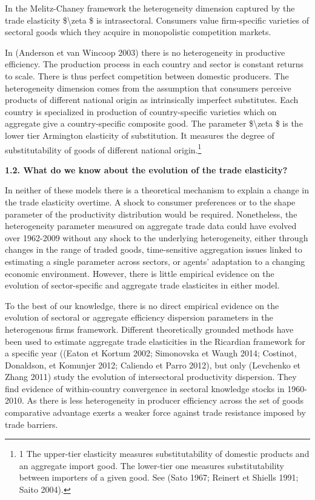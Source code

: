 \documentclass[12pt,twoside,a4paper,notitlepage]{article}
\begin{document}
In the Melitz-Chaney framework the heterogeneity dimension captured by the trade elasticity \$\textbackslash zeta \$ is intrasectoral. Consumers value firm-specific varieties of sectoral goods which they acquire in monopolistic competition markets.

In (Anderson et van Wincoop 2003) there is no heterogeneity in productive efficiency. The production process in each country and sector is constant returns to scale. There is thus perfect competition between domestic producers. The heterogeneity dimension comes from the assumption that consumers perceive products of different national origin as intrinsically imperfect substitutes. Each country is specialized in production of country-specific varieties which on aggregate give a country-specific composite good. The parameter \$\textbackslash zeta \$ is the lower tier Armington elasticity of substitution. It measures the degree of substitutability of goods of different national origin.\footnote{1 The upper-tier elasticity measures substitutability of domestic products and an aggregate import good. The lower-tier one measures substitutability between importers of a given good. See (Sato 1967; Reinert et Shiells 1991; Saito 2004).
} 

\textbf{1.2. What do we know about the evolution of the trade elasticity? \label{mark-1.2.}}

In neither of these models there is a theoretical mechanism to explain a change in the trade elasticity overtime. A shock to consumer preferences or to the shape parameter of the productivity distribution would be required. Nonetheless, the heterogeneity parameter measured on aggregate trade data could have evolved over 1962-2009 without any shock to the underlying heterogeneity, either through changes in the range of traded goods, time-sensitive aggregation issues linked to estimating a single parameter across sectors, or agents' adaptation to a changing economic environment. However, there is little empirical evidence on the evolution of sector-specific and aggregate trade elasticites in either model.

To the best of our knowledge, there is no direct empirical evidence on the evolution of sectoral or aggregate efficiency dispersion parameters in the heterogenous firms framework. Different theoretically grounded methods have been used to estimate aggregate trade elasticities in the Ricardian framework for a specific year ((Eaton et Kortum 2002; Simonovska et Waugh 2014; Costinot, Donaldson, et Komunjer 2012; Caliendo et Parro 2012), but only (Levchenko et Zhang 2011) study the evolution of intersectoral productivity dispersion. They find evidence of within-country convergence in sectoral knowledge stocks in 1960-2010. As there is less heterogeneity in producer efficiency across the set of goods comparative advantage exerts a weaker force against trade resistance imposed by trade barriers.
\end{document}
